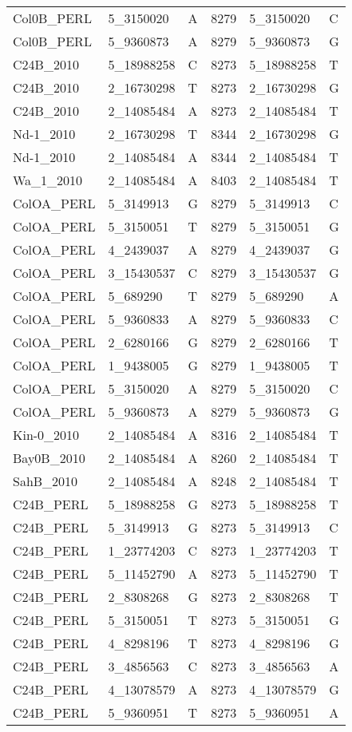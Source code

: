 \begin{center}
\begin{longtable}{|l|l|l|l|l|l|}
Col0B\_PERL&5\_3150020&A&8279&5\_3150020&C\\
Col0B\_PERL&5\_9360873&A&8279&5\_9360873&G\\
C24B\_2010&5\_18988258&C&8273&5\_18988258&T\\
C24B\_2010&2\_16730298&T&8273&2\_16730298&G\\
C24B\_2010&2\_14085484&A&8273&2\_14085484&T\\
Nd-1\_2010&2\_16730298&T&8344&2\_16730298&G\\
Nd-1\_2010&2\_14085484&A&8344&2\_14085484&T\\
Wa\_1\_2010&2\_14085484&A&8403&2\_14085484&T\\
ColOA\_PERL&5\_3149913&G&8279&5\_3149913&C\\
ColOA\_PERL&5\_3150051&T&8279&5\_3150051&G\\
ColOA\_PERL&4\_2439037&A&8279&4\_2439037&G\\
ColOA\_PERL&3\_15430537&C&8279&3\_15430537&G\\
ColOA\_PERL&5\_689290&T&8279&5\_689290&A\\
ColOA\_PERL&5\_9360833&A&8279&5\_9360833&C\\
ColOA\_PERL&2\_6280166&G&8279&2\_6280166&T\\
ColOA\_PERL&1\_9438005&G&8279&1\_9438005&T\\
ColOA\_PERL&5\_3150020&A&8279&5\_3150020&C\\
ColOA\_PERL&5\_9360873&A&8279&5\_9360873&G\\
Kin-0\_2010&2\_14085484&A&8316&2\_14085484&T\\
Bay0B\_2010&2\_14085484&A&8260&2\_14085484&T\\
SahB\_2010&2\_14085484&A&8248&2\_14085484&T\\
C24B\_PERL&5\_18988258&G&8273&5\_18988258&T\\
C24B\_PERL&5\_3149913&G&8273&5\_3149913&C\\
C24B\_PERL&1\_23774203&C&8273&1\_23774203&T\\
C24B\_PERL&5\_11452790&A&8273&5\_11452790&T\\
C24B\_PERL&2\_8308268&G&8273&2\_8308268&T\\
C24B\_PERL&5\_3150051&T&8273&5\_3150051&G\\
C24B\_PERL&4\_8298196&T&8273&4\_8298196&G\\
C24B\_PERL&3\_4856563&C&8273&3\_4856563&A\\
C24B\_PERL&4\_13078579&A&8273&4\_13078579&G\\
C24B\_PERL&5\_9360951&T&8273&5\_9360951&A\\

\end{longtable}
\end{center}
